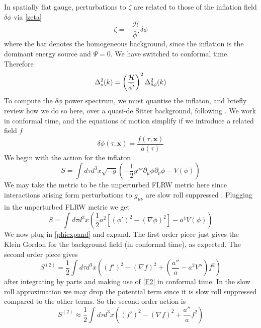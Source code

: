 \documentclass[a4paper,10pt]{article}
\renewcommand{\v}[1]{\mathbf{#1}}
\newcommand{\half}{\frac{1}{2}}
\newcommand{\bphi}{\bar{\phi}}
\begin{document}
In spatially flat gauge, perturbations to $\zeta$ are related to those of the inflation field $\delta\phi$ via \ref{zeta}
\begin{equation}
\zeta = -\frac{\mathcal{H}}{\bphi'}\delta\phi
\end{equation}
where the bar denotes the homogeneous background, since the inflation is the dominant energy source and $\Psi = 0$. We have switched to conformal time. Therefore
\begin{equation}
\Delta^2_{s}(k) =\left(\frac{\mathcal{H}}{\bphi'}\right)^2\Delta^2_{\delta\phi}(k)\\
\end{equation}
To compute the $\delta\phi$ power spectrum, we must quantise the inflaton, and briefly review how we do so here, over a quasi-de Sitter background, following \cite{baumann}. We work in conformal time, and the equations of motion simplify if we introduce a related field $f$ 
\begin{equation}
\delta\phi(\tau,\v{x}) = \frac{f(\tau, \v{x})}{a(\tau)}
\label{phiexpand}
\end{equation}
We begin with the action for the inflaton
\begin{equation}
S =  \int d\tau d^3x \sqrt{-g} \left(-\half g^{\mu \nu}\partial_\mu \phi\partial_\nu \phi - V(\phi)\right)
\end{equation}
We may take the metric to be the unperturbed FLRW metric here since interactions arising form perturbations to $g_{\mu\nu}$ are slow roll suppressed \cite{pajer}. Plugging in the unperturbed FLRW metric we get 
\begin{equation}
S = \int d\tau d^3x \left(\half a^2 [(\phi ' )^2 -(\nabla \phi)^2]-a^4V(\phi)\right)
\label{scalarfieldaction}
\end{equation}
We now plug in \ref{phiexpand} and expand. The first order piece just gives the Klein Gordon for the background field (in conformal time), as expected. The second order piece gives
\begin{equation}
S^{(2)} = \half \int d\tau d^3x \left((f')^2 - (\nabla f)^2 + (\frac{a''}{a}-a^2V'')f^2\right)
\end{equation}
after integrating by parts and making use of \ref{F2} in conformal time. In the slow roll approximation we may drop the potential term since it is slow roll suppressed compared to the other terms. So the second order action is 
\begin{equation}
S^{(2)} \approx \half \int d\tau d^3x \left((f')^2 - (\nabla f)^2 + \frac{a''}{a}f^2\right)
\end{equation}
\end{document}
